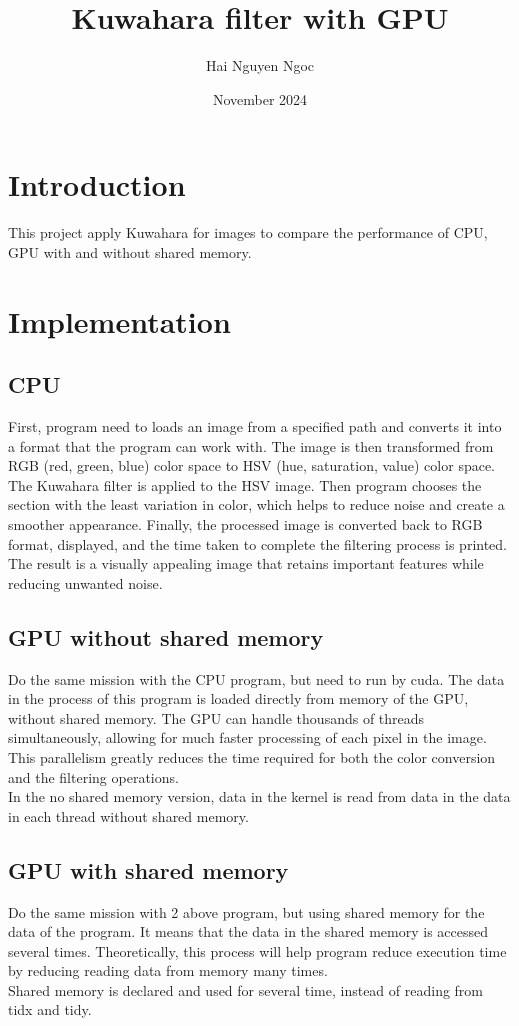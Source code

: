 \documentclass{article}
\title{Kuwahara filter with GPU}
\author{Hai Nguyen Ngoc}
\date{November 2024}
\begin{document}
\maketitle

\section{Introduction}
This project apply Kuwahara for images to compare the performance of CPU, GPU with and without shared memory.
\section{Implementation}
\subsection{CPU}
First, program need to loads an image from a specified path and converts it into a format that the program can work with. The image is then transformed from RGB (red, green, blue) color space to HSV (hue, saturation, value) color space. The Kuwahara filter is applied to the HSV image. Then program chooses the section with the least variation in color, which helps to reduce noise and create a smoother appearance. Finally, the processed image is converted back to RGB format, displayed, and the time taken to complete the filtering process is printed. The result is a visually appealing image that retains important features while reducing unwanted noise.
\subsection{GPU without shared memory}
Do the same mission with the CPU program, but need to run by cuda. The data in the process of this program is loaded directly from memory of the GPU, without shared memory. The GPU can handle thousands of threads simultaneously, allowing for much faster processing of each pixel in the image. This parallelism greatly reduces the time required for both the color conversion and the filtering operations.  \\
In the no shared memory version, data in the kernel is read from data in the data in each thread without shared memory.
\subsection{GPU with shared memory}
Do the same mission with 2 above program, but using shared memory for the data of the program. It means that the data in the shared memory is accessed several times. Theoretically, this process will help program reduce execution time by reducing reading data from memory many times. \\
Shared memory is declared and used for several time, instead of reading from tidx and tidy.
\end{document}

